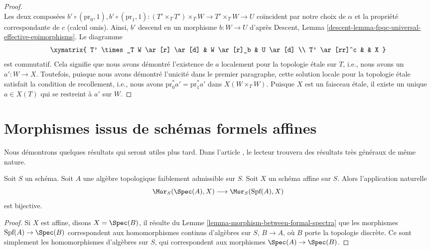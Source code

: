 \begin{proof}
$$$$
Les deux composées
$b' \circ (\text{pr}_0, 1), 
b' \circ (\text{pr}_1, 1) :
(T' \times_T T') \times_T W \to T' \times_T W \to U$
coïncident par notre choix de $\alpha$ et la propriété correspondante de $c$
(calcul omis). Ainsi, $b'$ descend en un morphisme $b : W \to U$ d'après
Descent, Lemma \ref{descent-lemma-fpqc-universal-effective-epimorphisms}.
Le diagramme
$$
\xymatrix{
T' \times_T W \ar[r] \ar[d] & W \ar[r]_b & U \ar[d] \\
T' \ar[rr]^c &  & X
}
$$
est commutatif. Cela signifie que nous avons démontré l'existence
de $a$ localement pour la topologie \'etale sur $T$, i.e., nous avons un $a' : W \to X$.
Toutefois, puisque nous avons démontré l'unicité
dans le premier paragraphe, cette solution locale pour la topologie \'etale
satisfait la condition de recollement, i.e., nous avons
$\text{pr}_0^*a' = \text{pr}_1^*a'$ dans $X(W \times_T W)$.
Puisque $X$ est un faisceau \'etale, il existe un unique $a \in X(T)$ qui se restreint
à $a'$ sur $W$.
\end{proof}





\section{Morphismes issus de schémas formels affines}
\label{section-map-out-of}

\noindent
Nous démontrons quelques résultats qui seront utiles plus tard.
Dans l'article \cite{Bhatt-Algebraize}, le lecteur trouvera
des résultats très généraux de même nature.

\begin{lemma}
\label{lemma-map-into-affine}
Soit $S$ un schéma. Soit $A$ une algèbre topologique faiblement admissible
sur $S$. Soit $X$ un schéma affine sur $S$. Alors
l'application naturelle
$$
\Mor_S(\Spec(A), X)
\longrightarrow
\Mor_S(\text{Spf}(A), X)
$$
est bijective.
\end{lemma}

\begin{proof}
Si $X$ est affine, disons $X = \Spec(B)$, il résulte du
Lemme \ref{lemma-morphism-between-formal-spectra}
que les morphismes $\text{Spf}(A) \to \Spec(B)$ correspondent aux homomorphismes continus
d'algèbres sur $S$, $B \to A$, où $B$ porte la topologie discrète.
Ce sont simplement les homomorphismes d'algèbres sur $S$, qui correspondent aux morphismes
$\Spec(A) \to \Spec(B)$.
\end{proof}

